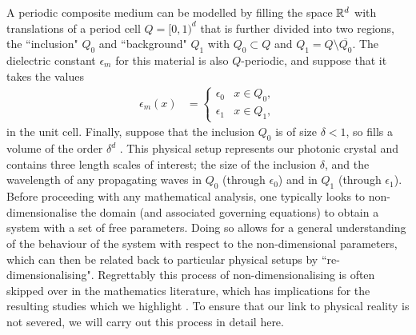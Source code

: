 
A periodic composite medium can be modelled by filling the space $\mathbb{R}^d$ with translations of a period cell $Q=[0,1)^d$ that is further divided into two regions, the ``inclusion" $Q_0$ and ``background" $Q_1$ with $Q_0\subset Q$ and $Q_1=Q\setminus\overline{Q_0}$.
The dielectric constant $\epsilon_m$ for this material is also $Q$-periodic, and suppose that it takes the values
\begin{align*}
	\epsilon_m(x) &= \begin{cases} \epsilon_0 & x\in Q_0, \\ \epsilon_1 & x\in Q_1, \end{cases}
\end{align*}
in the unit cell.
Finally, suppose that the inclusion $Q_0$ is of size $\delta<1$, so fills a volume of the order $\delta^d$ .
This physical setup represents our photonic crystal and contains three length scales of interest; the size of the inclusion $\delta$, and the wavelength of any propagating waves in $Q_0$ (through $\epsilon_0$) and in $Q_1$ (through $\epsilon_1$).
Before proceeding with any mathematical analysis, one typically looks to non-dimensionalise the domain (and associated governing equations) to obtain a system with a set of free parameters.
Doing so allows for a general understanding of the behaviour of the system with respect to the non-dimensional parameters, which can then be related back to particular physical setups by ``re-dimensionalising".
Regrettably this process of non-dimensionalising is often skipped over in the mathematics literature, which has implications for the resulting studies which we highlight .
To ensure that our link to physical reality is not severed, we will carry out this process in detail here.

